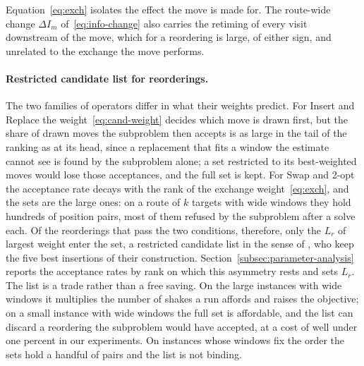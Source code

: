 Equation~\eqref{eq:exch} isolates the effect the move is made for. The route-wide change $\Delta I_m$ of~\eqref{eq:info-change} also carries the retiming of every visit downstream of the move, which for a reordering is large, of either sign, and unrelated to the exchange the move performs.

\paragraph{Restricted candidate list for reorderings.}
The two families of operators differ in what their weights predict. For Insert and Replace the weight~\eqref{eq:cand-weight} decides which move is drawn first, but the share of drawn moves the subproblem then accepts is as large in the tail of the ranking as at its head, since a replacement that fits a window the estimate cannot see is found by the subproblem alone; a set restricted to its best-weighted moves would lose those acceptances, and the full set is kept. For Swap and 2-opt the acceptance rate decays with the rank of the exchange weight~\eqref{eq:exch}, and the sets are the large ones: on a route of $k$ targets with wide windows they hold hundreds of position pairs, most of them refused by the subproblem after a solve each. Of the reorderings that pass the two conditions, therefore, only the $L_r$ of largest weight enter the set, a restricted candidate list in the sense of \citep{gunawan2015iterated}, who keep the five best insertions of their construction. Section~\ref{subsec:parameter-analysis} reports the acceptance rates by rank on which this asymmetry rests and sets $L_r$. The list is a trade rather than a free saving. On the large instances with wide windows it multiplies the number of shakes a run affords and raises the objective; on a small instance with wide windows the full set is affordable, and the list can discard a reordering the subproblem would have accepted, at a cost of well under one percent in our experiments. On instances whose windows fix the order the sets hold a handful of pairs and the list is not binding.

